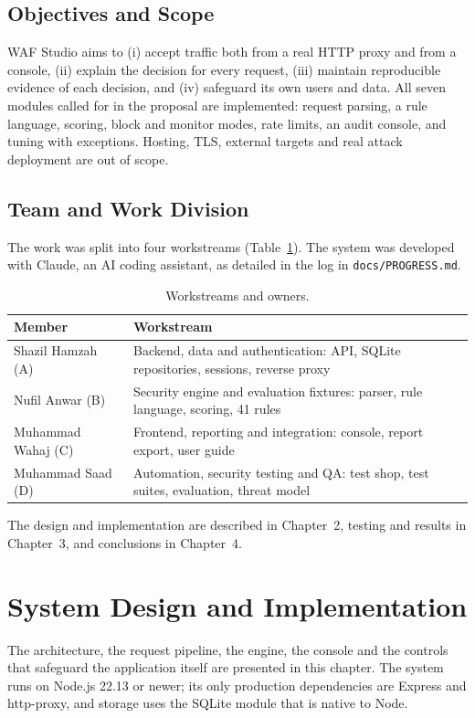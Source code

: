 \documentclass{FastFyp}
\newenvironment{rtab}{\small\singlespacing\renewcommand{\arraystretch}{1.3}}{}
\begin{document}
\section{Objectives and Scope}
WAF Studio aims to (i) accept traffic both from a real HTTP proxy and from a console, (ii) explain the decision for every request, (iii) maintain reproducible evidence of each decision, and (iv) safeguard its own users and data. All seven modules called for in the proposal are implemented: request parsing, a rule language, scoring, block and monitor modes, rate limits, an audit console, and tuning with exceptions. Hosting, TLS, external targets and real attack deployment are out of scope.

\section{Team and Work Division}
The work was split into four workstreams (Table~\ref{tab:team}). The system was developed with Claude, an AI coding assistant, as detailed in the log in \texttt{docs/PROGRESS.md}.

\begin{table}[!h]
\centering
\caption{Workstreams and owners.}
\begin{rtab}
\begin{tabular}{|p{3.2cm}|p{10.3cm}|}
\hline
\textbf{Member} & \textbf{Workstream} \\
\hline
Shazil Hamzah (A) & Backend, data and authentication: API, SQLite repositories, sessions, reverse proxy \\
\hline
Nufil Anwar (B) & Security engine and evaluation fixtures: parser, rule language, scoring, 41 rules \\
\hline
Muhammad Wahaj (C) & Frontend, reporting and integration: console, report export, user guide \\
\hline
Muhammad Saad (D) & Automation, security testing and QA: test shop, test suites, evaluation, threat model \\
\hline
\end{tabular}
\end{rtab}
\label{tab:team}
\end{table}

The design and implementation are described in Chapter~2, testing and results in Chapter~3, and conclusions in Chapter~4.

\chapter{System Design and Implementation}
The architecture, the request pipeline, the engine, the console and the controls that safeguard the application itself are presented in this chapter. The system runs on Node.js 22.13 or newer; its only production dependencies are Express and http-proxy, and storage uses the SQLite module that is native to Node.
\end{document}
